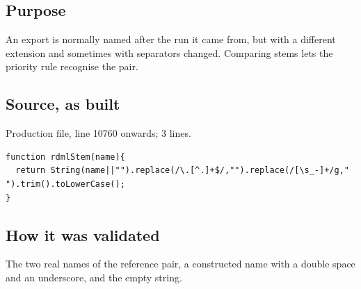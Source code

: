 \subsection*{Purpose}
An export is normally named after the run it came from, but with a different extension and
sometimes with separators changed. Comparing stems lets the priority rule recognise the pair.
\subsection*{Source, as built}
Production file, line 10760 onwards; 3 lines.
\begin{lstlisting}[style=js]
function rdmlStem(name){
  return String(name||"").replace(/\.[^.]+$/,"").replace(/[\s_-]+/g," ").trim().toLowerCase();
}
\end{lstlisting}

\subsection*{How it was validated}
The two real names of the reference pair, a constructed name with a double space and an
underscore, and the empty string.
